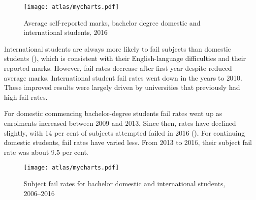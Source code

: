 \documentclass{grattan}
\begin{document}
    \begin{figure} %
    \caption{Average self-reported marks, bachelor degree domestic and international students, 2016}\label{fig:average-selfreported-marks-bachelor-degree-domestic-and-international-students-2016}
    \texttt{[image: atlas/mycharts.pdf]}
    \end{figure}


International students are always more likely to fail subjects than domestic students (), which is consistent with their English-language difficulties and their reported marks. However, fail rates decrease after first year despite reduced average marks. International student fail rates went down in the years to 2010. These improved results were largely driven by universities that previously had high fail rates.

For domestic commencing bachelor-degree students fail rates went up as enrolments increased between 2009 and 2013. Since then, rates have declined slightly, with 14 per cent of subjects attempted failed in 2016 (). For continuing domestic students, fail rates have varied less. From 2013 to 2016, their subject fail rate was about 9.5 per cent.


    \begin{figure} %
    \caption{Subject fail rates for bachelor domestic and international students, 2006--2016}\label{fig:subject-fail-rates-for-bachelor-domestic-and-international-students-20062016}
    \texttt{[image: atlas/mycharts.pdf]}
    \end{figure}
\end{document}
